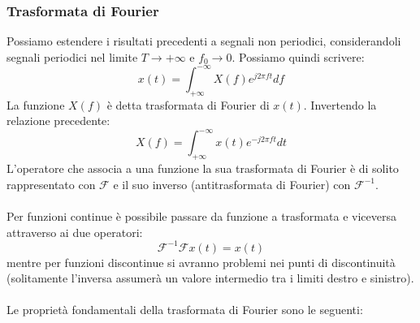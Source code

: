 \documentclass{article}
\begin{document}
\subsubsection{Trasformata di Fourier}
Possiamo estendere i risultati precedenti a segnali non periodici, considerandoli segnali periodici nel limite $T\rightarrow+\infty$ e $f_0\rightarrow0$. Possiamo quindi scrivere:
$$ x(t) = \int_{+\infty}^{-\infty}X(f)e^{j2\pi ft}df $$
La funzione $X(f)$ è detta trasformata di Fourier di $x(t)$. Invertendo la relazione precedente:
$$ X(f)=\int_{+\infty}^{-\infty}x(t)e^{-j2\pi ft}dt $$
L'operatore che associa a una funzione la sua trasformata di Fourier è di solito rappresentato con $\mathcal{F} $ e il suo inverso (antitrasformata di Fourier) con $\mathcal{F}^{-1}$.\\\\
Per funzioni continue è possibile passare da funzione a trasformata e viceversa attraverso ai due operatori:
$$ \mathcal{F}^{-1}\mathcal{F}x(t) = x(t) $$
mentre per funzioni discontinue si avranno problemi nei punti di discontinuità (solitamente l'inversa assumerà un valore intermedio tra i limiti destro e sinistro).\\\\
Le proprietà fondamentali della trasformata di Fourier sono le seguenti:
\end{document}

